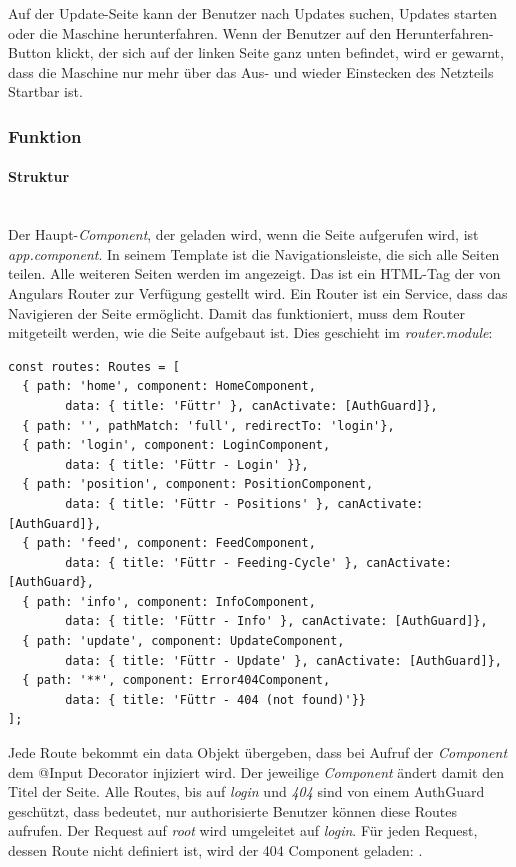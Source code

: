 Auf der Update-Seite kann der Benutzer nach Updates suchen, Updates starten oder die Maschine herunterfahren. Wenn der Benutzer auf den Herunterfahren-Button klickt, der sich auf der linken Seite ganz unten befindet, wird er gewarnt, dass die Maschine nur mehr über das Aus- und wieder Einstecken des Netzteils Startbar ist.\\

\subsubsection{Funktion}
\label{sec:ums-client-funktion}

\paragraph*{Struktur} \mbox {}\\
Der Haupt-\textit{Component}, der geladen wird, wenn die Seite aufgerufen wird, ist \textit{app.component}. In seinem Template ist die Navigationsleiste, die sich alle Seiten teilen. Alle weiteren Seiten werden im  angezeigt. Das ist ein \ac{HTML}-Tag der von Angulars Router zur Verfügung gestellt wird. Ein Router ist ein Service, dass das Navigieren der Seite ermöglicht. Damit das funktioniert, muss dem Router mitgeteilt werden, wie die Seite aufgebaut ist. Dies geschieht im \textit{router.module}:

\begin{lstlisting}[caption=Routes Definition,style=TS]
const routes: Routes = [
  { path: 'home', component: HomeComponent, 
  		data: { title: 'Füttr' }, canActivate: [AuthGuard]},
  { path: '', pathMatch: 'full', redirectTo: 'login'},
  { path: 'login', component: LoginComponent,
  		data: { title: 'Füttr - Login' }},
  { path: 'position', component: PositionComponent, 
  		data: { title: 'Füttr - Positions' }, canActivate: [AuthGuard]},
  { path: 'feed', component: FeedComponent, 
  		data: { title: 'Füttr - Feeding-Cycle' }, canActivate: [AuthGuard},
  { path: 'info', component: InfoComponent, 
  		data: { title: 'Füttr - Info' }, canActivate: [AuthGuard]},
  { path: 'update', component: UpdateComponent, 
  		data: { title: 'Füttr - Update' }, canActivate: [AuthGuard]},
  { path: '**', component: Error404Component, 
  		data: { title: 'Füttr - 404 (not found)'}}
];
\end{lstlisting}

Jede Route bekommt ein data Objekt übergeben, dass bei Aufruf der \textit{Component} dem @Input Decorator injiziert wird. Der jeweilige \textit{Component} ändert damit den Titel der Seite. Alle Routes, bis auf \textit{login} und \textit{404} sind von einem AuthGuard geschützt, dass bedeutet, nur authorisierte Benutzer können diese Routes aufrufen. Der Request auf \textit{root}  wird umgeleitet auf \textit{login}. Für jeden Request, dessen Route nicht definiert ist, wird der 404 Component geladen: .

